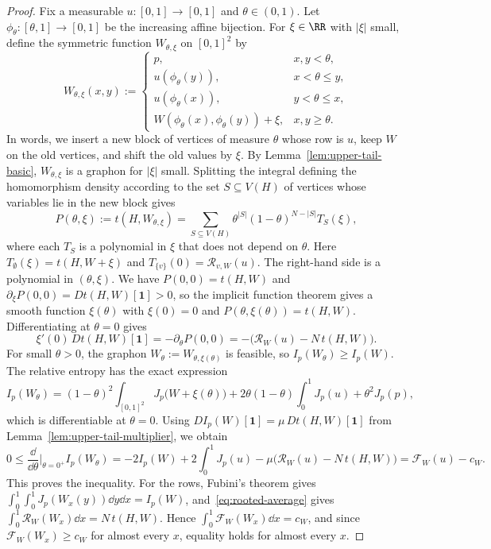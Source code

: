 \begin{proof}
Fix a measurable $u:[0,1]\to[0,1]$ and $\theta\in(0,1)$.  Let
$\phi_\theta:[\theta,1]\to[0,1]$ be the increasing affine bijection.  For
$\xi\in\RR$ with $|\xi|$ small, define the symmetric function
$W_{\theta,\xi}$ on $[0,1]^2$ by
\[
  W_{\theta,\xi}(x,y):=
  \begin{cases}
    p, & x,y<\theta,\\
    u(\phi_\theta(y)), & x<\theta\le y,\\
    u(\phi_\theta(x)), & y<\theta\le x,\\
    W(\phi_\theta(x),\phi_\theta(y))+\xi, & x,y\ge\theta.
  \end{cases}
\]
In words, we insert a new block of vertices of measure $\theta$ whose row is $u$,
keep $W$ on the old vertices, and shift the old values by $\xi$.  By
Lemma~\ref{lem:upper-tail-basic}, $W_{\theta,\xi}$ is a graphon for $|\xi|$ small.
Splitting the integral defining the homomorphism density according to the set
$S\subseteq V(H)$ of vertices whose variables lie in the new block gives
\[
  P(\theta,\xi):=t(H,W_{\theta,\xi})
  =\sum_{S\subseteq V(H)}\theta^{|S|}(1-\theta)^{N-|S|}T_S(\xi),
\]
where each $T_S$ is a polynomial in $\xi$ that does not depend on $\theta$.
Here $T_\emptyset(\xi)=t(H,W+\xi)$ and $T_{\{v\}}(0)=\mathcal R_{v,W}(u)$.
The right-hand side is a polynomial in $(\theta,\xi)$.  We have
$P(0,0)=t(H,W)$ and $\partial_\xi P(0,0)=Dt(H,W)[\mathbf1]>0$, so the implicit
function theorem gives a smooth function $\xi(\theta)$ with $\xi(0)=0$
and $P(\theta,\xi(\theta))=t(H,W)$.  Differentiating at $\theta=0$ gives
\[
  \xi'(0)\,Dt(H,W)[\mathbf1]=-\partial_\theta P(0,0)
  =-\bigl(\mathcal R_W(u)-N\,t(H,W)\bigr).
\]
For small $\theta>0$, the graphon $W_\theta:=W_{\theta,\xi(\theta)}$ is feasible, so
$I_p(W_\theta)\ge I_p(W)$.  The relative entropy has the exact expression
\[
  I_p(W_\theta)=(1-\theta)^2\int_{[0,1]^2}J_p\bigl(W+\xi(\theta)\bigr)
  +2\theta(1-\theta)\int_0^1J_p(u)+\theta^2J_p(p),
\]
which is differentiable at $\theta=0$.  Using
$DI_p(W)[\mathbf1]=\mu\,Dt(H,W)[\mathbf 1]$ from
Lemma~\ref{lem:upper-tail-multiplier}, we obtain
\[
  0\le\frac{\dd}{\dd\theta}\Big|_{\theta=0^+}I_p(W_\theta)
  =-2I_p(W)+2\int_0^1J_p(u)-\mu\bigl(\mathcal R_W(u)-N\,t(H,W)\bigr)
  =\mathcal F_W(u)-c_W.
\]
This proves the inequality.  For the rows, Fubini's theorem gives
$\int_0^1\int_0^1J_p(W_x(y))\dd y\dd x=I_p(W)$, and~\eqref{eq:rooted-average}
gives $\int_0^1\mathcal R_W(W_x)\dd x=N\,t(H,W)$.  Hence
$\int_0^1\mathcal F_W(W_x)\dd x=c_W$, and since $\mathcal F_W(W_x)\ge c_W$ for
almost every $x$, equality holds for almost every $x$.
\end{proof}

